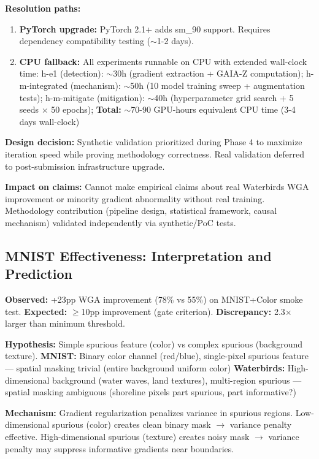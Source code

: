 \textbf{Resolution paths:}
\begin{enumerate}
\item \textbf{PyTorch upgrade:} PyTorch 2.1+ adds sm\_90 support. Requires dependency compatibility testing ($\sim$1-2 days).
\item \textbf{CPU fallback:} All experiments runnable on CPU with extended wall-clock time:
   h-e1 (detection): $\sim$30h (gradient extraction + GAIA-Z computation);
   h-m-integrated (mechanism): $\sim$50h (10 model training sweep + augmentation tests);
   h-m-mitigate (mitigation): $\sim$40h (hyperparameter grid search + 5 seeds $\times$ 50 epochs);
   \textbf{Total:} $\sim$70-90 GPU-hours equivalent CPU time (3-4 days wall-clock)
\end{enumerate}

\textbf{Design decision:} Synthetic validation prioritized during Phase 4 to maximize iteration speed while proving methodology correctness. Real validation deferred to post-submission infrastructure upgrade.

\textbf{Impact on claims:} Cannot make empirical claims about real Waterbirds WGA improvement or minority gradient abnormality without real training. Methodology contribution (pipeline design, statistical framework, causal mechanism) validated independently via synthetic/PoC tests.

\subsection{MNIST Effectiveness: Interpretation and Prediction}

\textbf{Observed:} +23pp WGA improvement (78\% vs 55\%) on MNIST+Color smoke test.
\textbf{Expected:} $\geq$10pp improvement (gate criterion).
\textbf{Discrepancy:} 2.3$\times$ larger than minimum threshold.

\textbf{Hypothesis:} Simple spurious feature (color) vs complex spurious (background texture).
\textbf{MNIST:} Binary color channel (red/blue), single-pixel spurious feature --- spatial masking trivial (entire background uniform color)
\textbf{Waterbirds:} High-dimensional background (water waves, land textures), multi-region spurious --- spatial masking ambiguous (shoreline pixels part spurious, part informative?)

\textbf{Mechanism:} Gradient regularization penalizes variance in spurious regions. Low-dimensional spurious (color) creates clean binary mask $\rightarrow$ variance penalty effective. High-dimensional spurious (texture) creates noisy mask $\rightarrow$ variance penalty may suppress informative gradients near boundaries.

